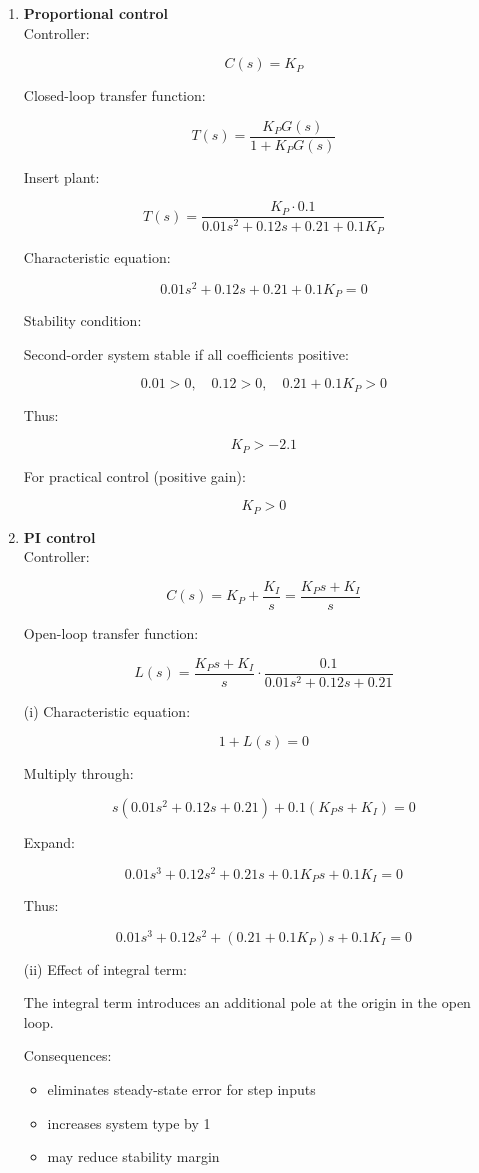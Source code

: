 \documentclass[a4paper,12pt]{article}
\begin{document}
\begin{enumerate}
\item[(e)] \textbf{Proportional control}~\\

Controller:

\[
C(s)=K_P
\]

Closed-loop transfer function:

\[
T(s)=\frac{K_P G(s)}{1+K_P G(s)}
\]

Insert plant:

\[
T(s)=\frac{K_P \cdot 0.1}{0.01s^2+0.12s+0.21+0.1K_P}
\]

Characteristic equation:

\[
0.01s^2+0.12s+0.21+0.1K_P=0
\]

Stability condition:

Second-order system stable if all coefficients positive:

\[
0.01>0,\quad 0.12>0,\quad 0.21+0.1K_P>0
\]

Thus:

\[
K_P>-2.1
\]

For practical control (positive gain):

\[
K_P>0
\]

\item[(f)] \textbf{PI control}~\\

Controller:

\[
C(s)=K_P+\frac{K_I}{s}=\frac{K_P s+K_I}{s}
\]

Open-loop transfer function:

\[
L(s)=\frac{K_P s+K_I}{s}\cdot \frac{0.1}{0.01s^2+0.12s+0.21}
\]

(i) Characteristic equation:

\[
1+L(s)=0
\]

Multiply through:

\[
s(0.01s^2+0.12s+0.21)+0.1(K_P s+K_I)=0
\]

Expand:

\[
0.01s^3+0.12s^2+0.21s+0.1K_P s+0.1K_I=0
\]

Thus:

\[
0.01s^3+0.12s^2+(0.21+0.1K_P)s+0.1K_I=0
\]

(ii) Effect of integral term:

The integral term introduces an additional pole at the origin in the open loop.

Consequences:

\begin{itemize}
  \item eliminates steady-state error for step inputs
  \item increases system type by 1
  \item may reduce stability margin
\end{itemize}


\end{enumerate}
\end{document}
